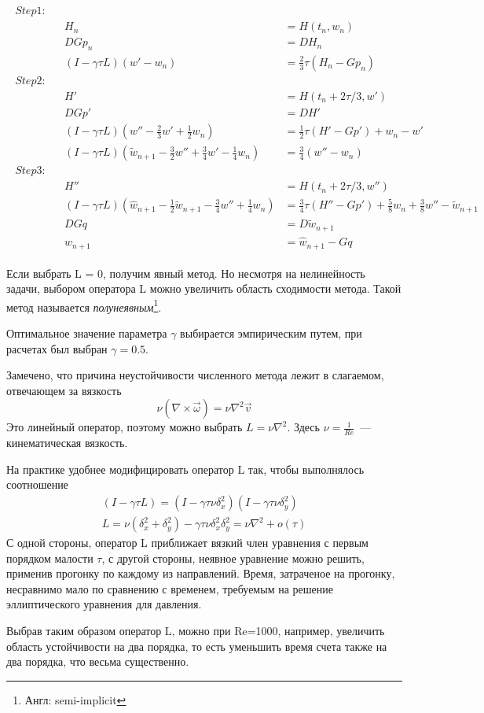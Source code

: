 \begin{gather}
\begin{align*}
Step 1:& \\
&&H_n &= H(t_n, w_n) \\
&&DGp_n &= DH_n \\
&&(I - \gamma \tau L)(w' - w_n) &= \frac{2}{3} \tau (H_n - Gp_n) \\
%
Step 2:& \\
&&H' &= H(t_n + 2\tau/3, w') \\
&&DGp' &= DH' \\
&&(I - \gamma \tau L)(w'' - \frac{2}{3}w' + \frac{1}{2}w_n) &= \frac{1}{2} \tau (H' - Gp') + w_n - w' \\
&&(I - \gamma \tau L)(\tilde w_{n+1} - \frac{3}{2}w'' + \frac{3}{4}w' - \frac{1}{4}w_n) &= \frac{3}{4}(w'' - w_n)\\
%
Step 3:& \\
&&H'' &= H(t_n + 2\tau/3, w'') \\
&&(I - \gamma \tau L)(\hat w_{n+1} - \frac{1}{2} \tilde w_{n+1} - \frac{3}{4}w'' + \frac{1}{4}w_n) &= \frac{3}{4} \tau (H'' - Gp') + 
	\frac{5}{8}w_n + \frac{3}{8}w'' - \tilde w_{n+1} \\
&&DGq &= D\tilde w_{n+1} \\
&&w_{n+1} &= \hat w_{n+1} - Gq
\end{align*}
\end{gather}

Если выбрать L = 0, получим явный метод. Но несмотря на нелинейность задачи, выбором оператора L можно увеличить область сходимости метода. Такой метод называется \textit{полунеявным}\footnote{Англ: semi-implicit}. 

Оптимальное значение параметра $\gamma$ выбирается эмпирическим путем, при расчетах был выбран $\gamma=0.5$. 

Замечено, что причина неустойчивости численного метода лежит в слагаемом, отвечающем за вязкость$$
	\nu (\nabla \times \vec \omega) = \nu \nabla ^2 \vec v
$$ Это линейный оператор, поэтому можно выбрать $L = \nu \nabla^2$. Здесь $\nu = \frac{1}{Re}$~--- кинематическая вязкость. 

На практике удобнее модифицировать оператор L так, чтобы выполнялось соотношение
\begin{gather*}
	(I - \gamma \tau L) = (I - \gamma \tau \nu \delta_x^2)(I - \gamma \tau \nu \delta_y^2) \\
	L =  \nu (\delta_x^2 + \delta_y^2) - \gamma \tau \nu \delta_x^2 \delta_y^2 = \nu \nabla^2 + o(\tau)
\end{gather*}
С одной стороны, оператор L приближает вязкий член уравнения с первым порядком малости $\tau$, с другой стороны, неявное уравнение можно решить, применив прогонку по каждому из направлений. Время, затраченое на прогонку, несравнимо мало по сравнению с временем, требуемым на решение эллиптического уравнения для давления. 

Выбрав таким образом оператор L, можно при Re=1000, например, увеличить область устойчивости на два порядка, то есть уменьшить время счета также на два порядка, что весьма существенно. 




